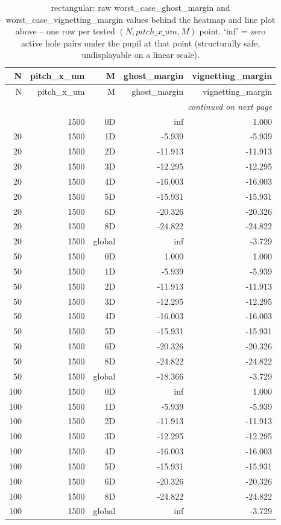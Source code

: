 \begin{longtable}{rrrrr}
\caption{rectangular: raw worst\_case\_ghost\_margin and worst\_case\_vignetting\_margin values behind the heatmap and line plot above -- one row per tested $(N, pitch\_x\_um, M)$ point. `inf' = zero active hole pairs under the pupil at that point (structurally safe, undisplayable on a linear scale).} \\
\toprule
N & pitch\_x\_um & M & ghost\_margin & vignetting\_margin \\
\midrule
\endfirsthead
\toprule
N & pitch\_x\_um & M & ghost\_margin & vignetting\_margin \\
\midrule
\endhead
\midrule
\multicolumn{5}{r}{\itshape continued on next page} \\
\endfoot
\bottomrule
\endlastfoot
20 & 1500 & 0D & inf & 1.000 \\
20 & 1500 & 1D & -5.939 & -5.939 \\
20 & 1500 & 2D & -11.913 & -11.913 \\
20 & 1500 & 3D & -12.295 & -12.295 \\
20 & 1500 & 4D & -16.003 & -16.003 \\
20 & 1500 & 5D & -15.931 & -15.931 \\
20 & 1500 & 6D & -20.326 & -20.326 \\
20 & 1500 & 8D & -24.822 & -24.822 \\
20 & 1500 & global & inf & -3.729 \\
50 & 1500 & 0D & 1.000 & 1.000 \\
50 & 1500 & 1D & -5.939 & -5.939 \\
50 & 1500 & 2D & -11.913 & -11.913 \\
50 & 1500 & 3D & -12.295 & -12.295 \\
50 & 1500 & 4D & -16.003 & -16.003 \\
50 & 1500 & 5D & -15.931 & -15.931 \\
50 & 1500 & 6D & -20.326 & -20.326 \\
50 & 1500 & 8D & -24.822 & -24.822 \\
50 & 1500 & global & -18.366 & -3.729 \\
100 & 1500 & 0D & inf & 1.000 \\
100 & 1500 & 1D & -5.939 & -5.939 \\
100 & 1500 & 2D & -11.913 & -11.913 \\
100 & 1500 & 3D & -12.295 & -12.295 \\
100 & 1500 & 4D & -16.003 & -16.003 \\
100 & 1500 & 5D & -15.931 & -15.931 \\
100 & 1500 & 6D & -20.326 & -20.326 \\
100 & 1500 & 8D & -24.822 & -24.822 \\
100 & 1500 & global & inf & -3.729 \\
\end{longtable}
